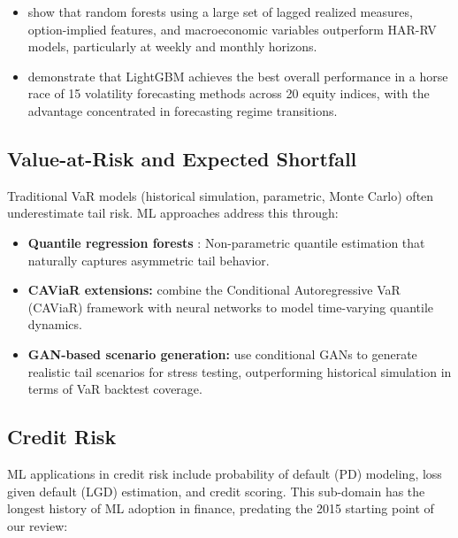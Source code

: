\begin{itemize}[leftmargin=*]
    \item \citet{Luong2021} show that random forests using a large set of lagged realized measures, option-implied features, and macroeconomic variables outperform HAR-RV models, particularly at weekly and monthly horizons.

    \item \citet{Mittnik2022} demonstrate that LightGBM achieves the best overall performance in a horse race of 15 volatility forecasting methods across 20 equity indices, with the advantage concentrated in forecasting regime transitions.
\end{itemize}

\subsection{Value-at-Risk and Expected Shortfall}

Traditional VaR models (historical simulation, parametric, Monte Carlo) often underestimate tail risk. ML approaches address this through:

\begin{itemize}[leftmargin=*]
    \item \textbf{Quantile regression forests} \citep{Meinshausen2006}: Non-parametric quantile estimation that naturally captures asymmetric tail behavior.

    \item \textbf{CAViaR extensions:} \citet{Taylor2019} combine the Conditional Autoregressive VaR (CAViaR) framework with neural networks to model time-varying quantile dynamics.

    \item \textbf{GAN-based scenario generation:} \citet{Cont2022} use conditional GANs to generate realistic tail scenarios for stress testing, outperforming historical simulation in terms of VaR backtest coverage.
\end{itemize}

\subsection{Credit Risk}

ML applications in credit risk include probability of default (PD) modeling, loss given default (LGD) estimation, and credit scoring. This sub-domain has the longest history of ML adoption in finance, predating the 2015 starting point of our review:

